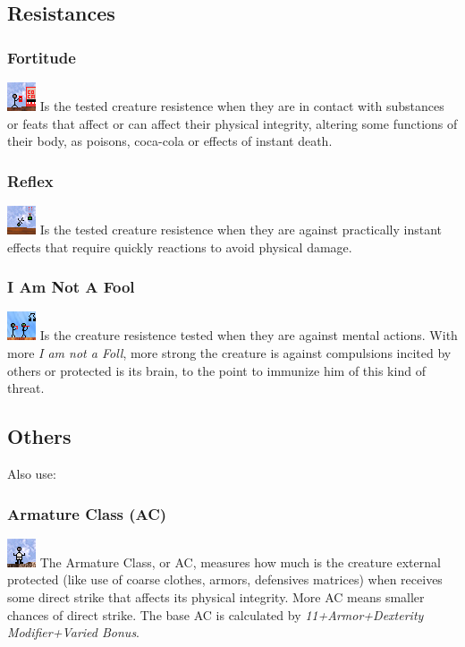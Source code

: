 \documentclass[ letterpaper,12pt]{article}
\begin{document}
\subsection{Resistances}

\subsubsection{Fortitude}
\includegraphics{../data/skills/Img/fortitude.png}
Is the tested creature resistence when they are in contact with substances or feats that affect or can affect their physical integrity, altering some functions of their body, as poisons, coca-cola or effects of instant death.

\subsubsection{Reflex}
\includegraphics{../data/skills/Img/reflexos.png}
Is the tested creature resistence when they are against practically instant effects that require quickly reactions to avoid physical damage.  

\subsubsection{I Am Not A Fool}
\includegraphics{../data/skills/Img/vontade.png}
Is the creature resistence tested when they are against mental actions. With more {\it I am not a Foll}, more strong the creature is against compulsions incited by others or protected is its brain, to the point to immunize him of this kind of threat.

\subsection{Others}
Also use:

\subsubsection{Armature Class (AC)}
\includegraphics{../data/skills/Img/ca.png}
The Armature Class, or AC, measures how much is the creature external protected (like use of coarse clothes, armors, defensives matrices) when receives some direct strike that affects its physical integrity. More AC means smaller chances of direct strike. The base AC is calculated by {\it 11+Armor+Dexterity Modifier+Varied Bonus}.
\end{document}
